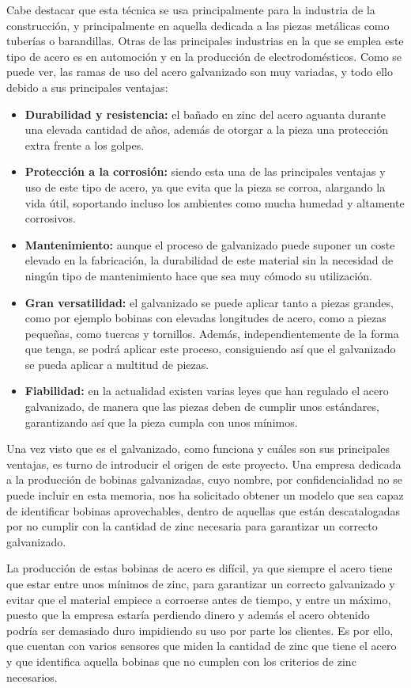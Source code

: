 Cabe destacar que esta técnica se usa principalmente para la industria de la construcción, y principalmente en aquella dedicada a las piezas metálicas como tuberías o barandillas. Otras de las principales industrias en la que se emplea este tipo de acero es en automoción y en la producción de electrodomésticos. Como se puede ver, las ramas de uso del acero galvanizado son muy variadas, y todo ello debido a sus principales ventajas:
\begin{itemize}
    \item \textbf{Durabilidad y resistencia:} el bañado en zinc del acero aguanta durante una elevada cantidad de años, además de otorgar a la pieza una protección extra frente a los golpes.
    \item \textbf{Protección a la corrosión:} siendo esta una de las principales ventajas y uso de este tipo de acero, ya que evita que la pieza se corroa, alargando la vida útil, soportando incluso los ambientes como mucha humedad y altamente corrosivos.
    \item \textbf{Mantenimiento:} aunque el proceso de galvanizado puede suponer un coste elevado en la fabricación, la durabilidad de este material sin la necesidad de ningún tipo de mantenimiento hace que sea muy cómodo su utilización.
    \item \textbf{Gran versatilidad:} el galvanizado se puede aplicar tanto a piezas grandes, como por ejemplo bobinas con elevadas longitudes de acero, como a piezas pequeñas, como tuercas y tornillos. Además, independientemente de la forma que tenga, se podrá aplicar este proceso, consiguiendo así que el galvanizado se pueda aplicar a multitud de piezas.
    \item \textbf{Fiabilidad:} en la actualidad existen varias leyes que han regulado el acero galvanizado, de manera que las piezas deben de cumplir unos estándares, garantizando así que la pieza cumpla con unos mínimos.
\end{itemize}

Una vez visto que es el galvanizado, como funciona y cuáles son sus principales ventajas, es turno de introducir el origen de este proyecto. Una empresa dedicada a la producción de bobinas galvanizadas, cuyo nombre, por confidencialidad no se puede incluir en esta memoria, nos ha solicitado obtener un modelo que sea capaz de identificar bobinas aprovechables, dentro de aquellas que están descatalogadas por no cumplir con la cantidad de zinc necesaria para garantizar un correcto galvanizado. 

La producción de estas bobinas de acero \cite{gonzalez2008desarrollo} es difícil, ya que siempre el acero tiene que estar entre unos mínimos de zinc, para garantizar un correcto galvanizado y evitar que el material empiece a corroerse antes de tiempo, y entre un máximo, puesto que la empresa estaría perdiendo dinero y además el acero obtenido podría ser demasiado duro impidiendo su uso por parte los clientes. Es por ello, que cuentan con varios sensores que miden la cantidad de zinc que tiene el acero y que identifica aquella bobinas que no cumplen con los criterios de zinc necesarios.

